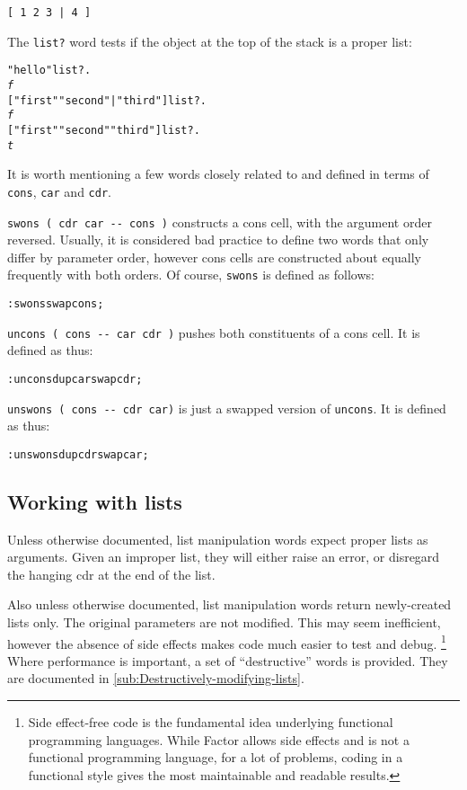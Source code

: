 \documentclass[english]{article}
\begin{document}
\begin{verbatim}
[ 1 2 3 | 4 ]
\end{verbatim}

The \texttt{list?} word tests if the object at the top of the stack
is a proper list:

\begin{alltt}
"hello" list? .
\emph{f}
{[} "first" "second" | "third" {]} list? .
\emph{f}
{[} "first" "second" "third" {]} list? .
\emph{t}
\end{alltt}

It is worth mentioning a few words closely related to and defined in terms of \texttt{cons}, \texttt{car} and \texttt{cdr}.

\texttt{swons ( cdr car -{}- cons )} constructs a cons cell, with the argument order reversed. Usually, it is considered bad practice to define two words that only differ by parameter order, however cons cells are constructed about equally frequently with both orders. Of course, \texttt{swons} is defined as follows:

\begin{alltt}
: swons swap cons ;
\end{alltt}

\texttt{uncons ( cons -{}- car cdr )} pushes both constituents of a cons cell. It is defined as thus:

\begin{alltt}
: uncons dup car swap cdr ;
\end{alltt}

\texttt{unswons ( cons -{}- cdr car)} is just a swapped version of \texttt{uncons}. It is defined as thus:

\begin{alltt}
: unswons dup cdr swap car ;
\end{alltt}

\subsection{Working with lists}

Unless otherwise documented, list manipulation words expect proper
lists as arguments. Given an improper list, they will either raise
an error, or disregard the hanging cdr at the end of the list.

Also unless otherwise documented, list manipulation words return newly-created
lists only. The original parameters are not modified. This may seem
inefficient, however the absence of side effects makes code much easier
to test and debug.%
\footnote{Side effect-free code is the fundamental idea underlying functional
programming languages. While Factor allows side effects and is not
a functional programming language, for a lot of problems, coding in
a functional style gives the most maintainable and readable results.%
} Where performance is important, a set of {}``destructive'' words
is provided. They are documented in \ref{sub:Destructively-modifying-lists}.
\end{document}
